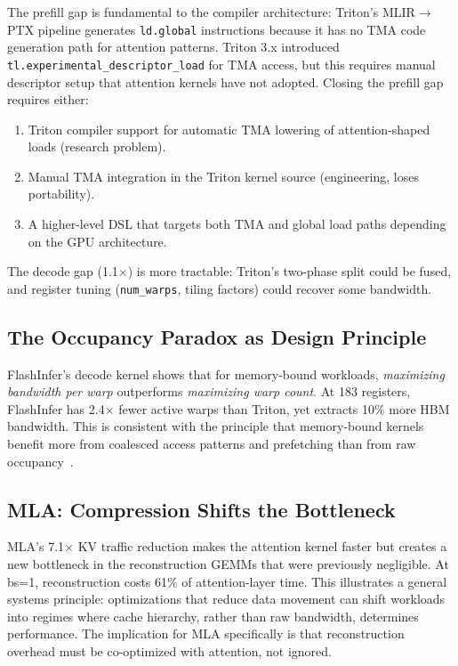 \documentclass[10pt,twocolumn]{article}
\begin{document}
The prefill gap is fundamental to the compiler architecture: Triton's MLIR$\to$PTX pipeline generates \texttt{ld.global} instructions because it has no TMA code generation path for attention patterns.  Triton 3.x introduced \texttt{tl.experimental\_descriptor\_load} for TMA access, but this requires manual descriptor setup that attention kernels have not adopted.  Closing the prefill gap requires either:

\begin{enumerate}[leftmargin=*,topsep=0pt]
  \item Triton compiler support for automatic TMA lowering of attention-shaped loads (research problem).
  \item Manual TMA integration in the Triton kernel source (engineering, loses portability).
  \item A higher-level DSL that targets both TMA and global load paths depending on the GPU architecture.
\end{enumerate}

The decode gap (1.1$\times$) is more tractable: Triton's two-phase split could be fused, and register tuning (\texttt{num\_warps}, tiling factors) could recover some bandwidth.

\subsection{The Occupancy Paradox as Design Principle}

FlashInfer's decode kernel shows that for memory-bound workloads, \emph{maximizing bandwidth per warp} outperforms \emph{maximizing warp count}.  At 183 registers, FlashInfer has 2.4$\times$ fewer active warps than Triton, yet extracts 10\% more HBM bandwidth.  This is consistent with the principle that memory-bound kernels benefit more from coalesced access patterns and prefetching than from raw occupancy~\cite{volkov2010}.

\subsection{MLA: Compression Shifts the Bottleneck}

MLA's 7.1$\times$ KV traffic reduction makes the attention kernel faster but creates a new bottleneck in the reconstruction GEMMs that were previously negligible.  At bs=1, reconstruction costs 61\% of attention-layer time.  This illustrates a general systems principle: optimizations that reduce data movement can shift workloads into regimes where cache hierarchy, rather than raw bandwidth, determines performance.  The implication for MLA specifically is that reconstruction overhead must be co-optimized with attention, not ignored.
\end{document}
